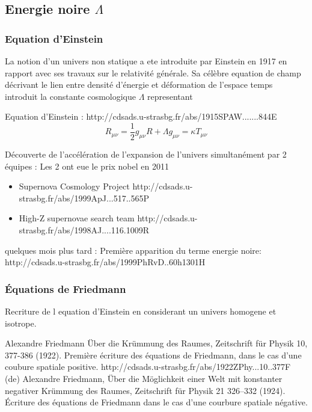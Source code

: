 \citep{planck_collaboration_planck_2016}

\subsection{Energie noire $\Lambda$}

\subsubsection{Equation d'Einstein}

La notion d'un univers non statique a ete introduite par Einstein en 1917 en rapport avec ses travaux sur le relativité générale. 
Sa célèbre equation de champ décrivant le lien entre densité d'énergie et déformation de l'espace temps introduit la constante cosmologique $\Lambda$ representant 

Equation d'Einstein :
http://cdsads.u-strasbg.fr/abs/1915SPAW.......844E
\begin{equation}
R_{\mu\nu} = \frac{1}{2} g_{\mu\nu}R + \Lambda g_{\mu\nu}  = \kappa T_{\mu\nu}
\end{equation} 



Découverte de l'accélération de l'expansion de l'univers simultanément par 2 équipes :
Les 2 ont eue le prix nobel en 2011

\begin{itemize}
\item  Supernova Cosmology Project
 http://cdsads.u-strasbg.fr/abs/1999ApJ...517..565P
 
 \item  High-Z supernovae search team
http://cdsads.u-strasbg.fr/abs/1998AJ....116.1009R

\end{itemize}

quelques mois plus tard :
Première apparition du terme energie noire:
http://cdsads.u-strasbg.fr/abs/1999PhRvD..60h1301H



\subsubsection{ Équations de Friedmann }

 Recriture de l equation d'Einstein en considerant un univers homogene et isotrope.
 
 Alexandre Friedmann Über die Krümmung des Raumes, Zeitschrift für Physik 10, 377-386 (1922). Première écriture des équations de Friedmann, dans le cas d'une coubure spatiale positive. http://cdsads.u-strasbg.fr/abs/1922ZPhy...10..377F 
(de) Alexandre Friedmann, Über die Möglichkeit einer Welt mit konstanter negativer Krümmung des Raumes, Zeitschrift für Physik 21 326–332 (1924). Écriture des équations de Friedmann dans le cas d'une courbure spatiale négative. 
 
